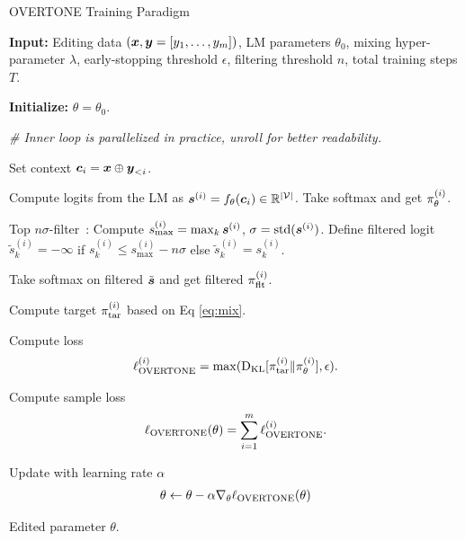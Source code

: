 \begin{algorithm}[!t]
\caption{OVERTONE Training Paradigm}
\label{alg:ours}
\begin{algorithmic}[1]
\STATE \textbf{Input:}
Editing data $(\boldsymbol{x}, \boldsymbol{y} = [y_1, \dots, y_m])$, 
LM parameters $\theta_0$, 
mixing hyper-parameter $\lambda$,
early-stopping threshold $\epsilon$, 
filtering threshold $n$,
total training steps $T$. 

\STATE \textbf{Initialize: }
$\theta = \theta_0$.


\STATE
\textit{{\# Inner loop is parallelized in practice, unroll for better readability.}}

\STATE
Set context ${\boldsymbol{c}}_i = \boldsymbol{x} \oplus \boldsymbol{y}_{<i}$. 


\STATE 
Compute logits from the LM as ${\boldsymbol{s}}^{(i)} = f_\theta({\boldsymbol{c}}_i) \in \mathbb{R}^{|\mathcal V|}$.
Take softmax and get $\pi_\theta^{(i)}$. 

\STATE
Top $n\sigma$-filter~\citep{tang2024top}:
Compute $s^{(i)}_{\max} = \max_k {\boldsymbol{s}}^{(i)}$, $\sigma = \text{std}({\boldsymbol{s}}^{(i)})$. 
Define filtered logit $\tilde s^{(i)}_k = -\infty$ if $s^{(i)}_k \leq s^{(i)}_{\max} - n \sigma$ else $\tilde s^{(i)}_k = s^{(i)}_k$. 

\STATE
Take softmax on filtered $\tilde {{\boldsymbol{s}}}$ and get filtered $\pi_\text{flt}^{(i)}$.

\STATE
Compute target $\pi_\text{tar}^{(i)}$ based on Eq \eqref{eq:mix}. 


\STATE
Compute loss 
\begin{align*}
    \ell_{\text{OVERTONE}}^{(i)} = 
    \max(\text{D}_\text{KL}[\pi_\text{tar}^{(i)} \| \pi_\theta^{(i)}], \epsilon).
\end{align*}

\ENDFOR

\STATE
Compute sample loss 
\begin{align*}
    \ell_{\text{OVERTONE}}(\theta) = \sum_{i=1}^m \ell_{\text{OVERTONE}}^{(i)}. 
\end{align*}

\STATE
Update with learning rate $\alpha$
\begin{align*}
    \theta \leftarrow \theta - \alpha \nabla_\theta \ell_{\text{OVERTONE}}(\theta)
\end{align*}

\ENDFOR 
\OUTPUT Edited parameter $\theta$. 
\end{algorithmic}
\end{algorithm}












